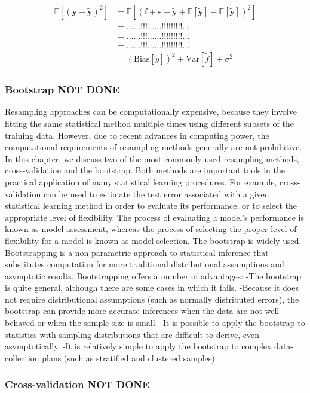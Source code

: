 \begin{align*}
\mathbb{E}\left[(\mathbf{y}-\mathbf{\tilde{y}})^2\right]
&=\mathbb{E}\left[(\mathbf{f}+\mathbf{\epsilon}-\mathbf{\tilde{y}}+\mathbb{E}\left[\mathbf{\tilde{y}}\right]-\mathbb{E}\left[\mathbf{\tilde{y}}\right])^2\right]
\\
&= ... ... !!! ... ... !!! !!! !!! ...
\\
&= ... ... !!! ... ... !!! !!! !!! ...
\\
&= ... ... !!! ... ... !!! !!! !!! ...
\\
&=\left(\mbox{Bias}\left[{\tilde y}\right] \right)^2 + \mbox{Var}\left[{\tilde f} \right] + \sigma^2
\end{align*}




\subsubsection{Bootstrap NOT DONE}
Resampling approaches can be computationally expensive, because they involve fitting the same statistical method multiple times using different subsets of the training data. However, due to recent advances in computing power, the computational requirements of resampling methods generally are not prohibitive. In this chapter, we discuss two of the most commonly used resampling methods, cross-validation and the bootstrap. Both methods are important tools in the practical application of many statistical learning procedures. For example, cross-validation can be used to estimate the test error associated with a given statistical learning method in order to evaluate its performance, or to select the appropriate level of flexibility. The process of evaluating a model’s performance is known as model assessment, whereas the process of selecting the proper level of flexibility for a model is known as model selection. The bootstrap is widely used.
Bootstrapping is a non-parametric approach to statistical inference that substitutes computation for more traditional distributional assumptions and asymptotic results. Bootstrapping offers a number of advantages:
-The bootstrap is quite general, although there are some cases in which it fails.
-Because it does not require distributional assumptions (such as normally distributed errors), the bootstrap can provide more accurate inferences when the data are not well behaved or when the sample size is small.
-It is possible to apply the bootstrap to statistics with sampling distributions that are difficult to derive, even asymptotically.
-It is relatively simple to apply the bootstrap to complex data-collection plans (such as stratified and clustered samples).


\subsubsection{Cross-validation NOT DONE}

